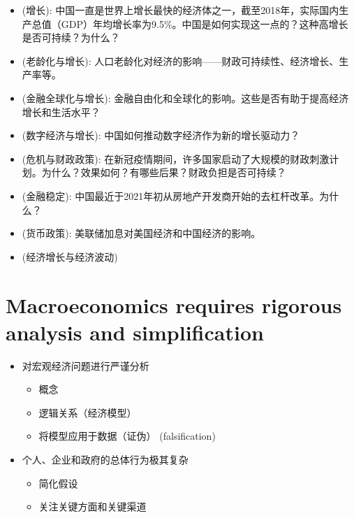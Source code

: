\begin{itemize}
    \item (增长): 中国一直是世界上增长最快的经济体之一，截至2018年，实际国内生产总值（GDP）年均增长率为9.5\%。中国是如何实现这一点的？这种高增长是否可持续？为什么？
    \item (老龄化与增长): 人口老龄化对经济的影响——财政可持续性、经济增长、生产率等。
    \item (金融全球化与增长): 金融自由化和全球化的影响。这些是否有助于提高经济增长和生活水平？
    \item (数字经济与增长): 中国如何推动数字经济作为新的增长驱动力？
    \item (危机与财政政策): 在新冠疫情期间，许多国家启动了大规模的财政刺激计划。为什么？效果如何？有哪些后果？财政负担是否可持续？
    \item (金融稳定): 中国最近于2021年初从房地产开发商开始的去杠杆改革。为什么？
    \item (货币政策): 美联储加息对美国经济和中国经济的影响。
    \item (经济增长与经济波动)
\end{itemize}

\section{Macroeconomics requires rigorous analysis and simplification}
\begin{itemize}
    \item 对宏观经济问题进行严谨分析
    \begin{itemize}
        \item 概念
        \item 逻辑关系（经济模型）
        \item 将模型应用于数据（证伪） (falsification)
    \end{itemize}
    \item 个人、企业和政府的总体行为极其复杂
    \begin{itemize}
        \item 简化假设
        \item 关注关键方面和关键渠道
    \end{itemize}
\end{itemize}
